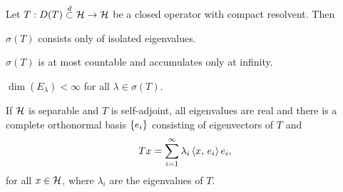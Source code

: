 \begin{theorem}
    Let $T:D(T)\overset{d}{\subset}\mathcal{H}\to\mathcal{H}$ be a closed operator with compact 
    resolvent. Then 
    \begin{thmenum}
        \item $\sigma(T)$ consists only of isolated eigenvalues.
        \item $\sigma(T)$ is at most countable and accumulates only at infinity. 
        \item $\dim(E_\lambda) < \infty$ for all $\lambda\in\sigma(T)$. 
        \item If $\mathcal{H}$ is separable and $T$ is self-adjoint, all eigenvalues 
        are real and there is a complete orthonormal basis $\left\{ {e_i} \right\}$ consisting 
        of eigenvectors of $T$ and 
        \begin{equation*}
            Tx = \sum_{i=1}^\infty \lambda_i\left\langle {x},\, {e_i} \right\rangle e_i,
        \end{equation*}
        for all $x\in\mathcal{H}$, where $\lambda_i$ are the eigenvalues of $T$.
    \end{thmenum}
\end{theorem}
